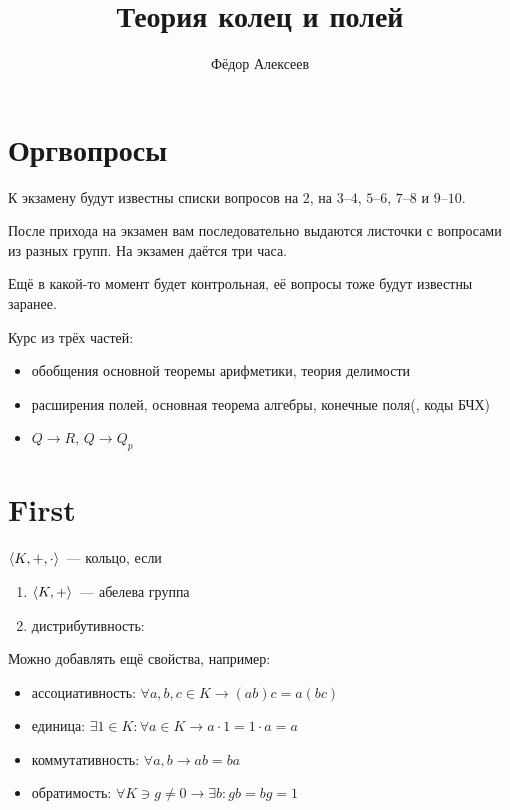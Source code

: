 



\title{Теория колец и полей}
\author{Фёдор Алексеев}

\maketitle
\gitlink{}
\tableofcontents\newpage{}

\section*{Оргвопросы}
\label{sec:organization}
К экзамену будут известны списки вопросов на $2$, на $3$--$4$, $5$--$6$, $7$--$8$ и $9$--$10$.

После прихода на экзамен вам последовательно выдаются листочки с вопросами из разных групп.
На экзамен даётся три часа.

Ещё в какой-то момент будет контрольная, её вопросы тоже будут известны заранее.

Курс из трёх частей:
\begin{itemize}
  \item обобщения основной теоремы арифметики, теория делимости
  \item расширения полей, основная теорема алгебры, конечные поля(, коды БЧХ)
  \item $Q \rightarrow R$, $Q \rightarrow Q_p$
\end{itemize}

\section{First}
\label{sec:first}

\begin{define*}
  $\braket{K, +, \cdot}$~--- кольцо, если 
  \begin{enumerate}
    \item $\braket{K,+}$~--- абелева группа
    \item дистрибутивность:
  \end{enumerate}
\end{define*}

Можно добавлять ещё свойства, например:
\begin{itemize}
  \item ассоциативность: $\forall a,b,c \in K \rightarrow (ab)c = a(bc)$
  \item единица: $\exists 1 \in K : \forall a \in K \rightarrow a\cdot 1 = 1 \cdot a = a$
  \item коммутативность: $\forall a, b \rightarrow ab=ba$
  \item обратимость: $\forall K \ni g\ne 0 \rightarrow \exists b : gb = bg = 1$
\end{itemize}


